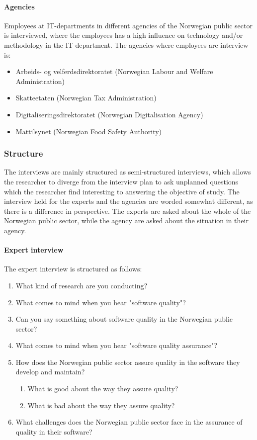 \paragraph{Agencies}
Employees at IT-departments in different agencies of the Norwegian public sector is interviewed, where the employees has a high influence on technology and/or methodology in the IT-department. The agencies where employees are interview is:

\begin{itemize}
    \item Arbeids- og velferdsdirektoratet (Norwegian Labour and Welfare Administration)
    \item Skatteetaten (Norwegian Tax Administration)
    \item Digitaliseringsdirektoratet (Norwegian Digitalisation Agency)
    \item Mattilsynet (Norwegian Food Safety Authority)
\end{itemize}

\subsubsection{Structure}
The interviews are mainly structured as semi-structured interviews, which allows the researcher to diverge from the interview plan to ask unplanned questions which the researcher find interesting to answering the objective of study. The interview held for the experts and the agencies are worded somewhat different, as there is a difference in perspective. The experts are asked about the whole of the Norwegian public sector, while the agency are asked about the situation in their agency.

\paragraph{Expert interview}
The expert interview is structured as follows:

\begin{enumerate}
    \item What kind of research are you conducting?
    \item What comes to mind when you hear "software quality"?
    \item Can you say something about software quality in the Norwegian public sector?
    \item What comes to mind when you hear "software quality assurance"?
    \item How does the Norwegian public sector assure quality in the software they develop and maintain?
    \begin{enumerate}
        \item What is good about the way they assure quality?
        \item What is bad about the way they assure quality?
    \end{enumerate}
    \item What challenges does the Norwegian public sector face in the assurance of quality in their software?
\end{enumerate}

